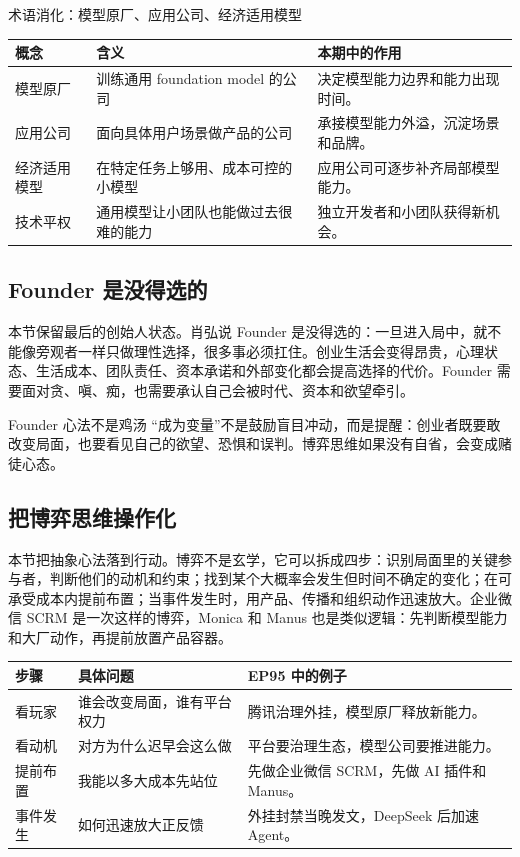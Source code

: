 \begin{knowledgebox}{术语消化：模型原厂、应用公司、经济适用模型}
\noindent\begin{tabularx}{\textwidth}{p{}p{}X}
\toprule
概念 & 含义 & 本期中的作用 \\
\midrule
模型原厂 & 训练通用 foundation model 的公司 & 决定模型能力边界和能力出现时间。 \\
应用公司 & 面向具体用户场景做产品的公司 & 承接模型能力外溢，沉淀场景和品牌。 \\
经济适用模型 & 在特定任务上够用、成本可控的小模型 & 应用公司可逐步补齐局部模型能力。 \\
技术平权 & 通用模型让小团队也能做过去很难的能力 & 独立开发者和小团队获得新机会。 \\
\bottomrule
\end{tabularx}
\end{knowledgebox}

\subsection{Founder 是没得选的}

本节保留最后的创始人状态。肖弘说 Founder 是没得选的：一旦进入局中，就不能像旁观者一样只做理性选择，很多事必须扛住。创业生活会变得昂贵，心理状态、生活成本、团队责任、资本承诺和外部变化都会提高选择的代价。Founder 需要面对贪、嗔、痴，也需要承认自己会被时代、资本和欲望牵引。

\begin{warningbox}{Founder 心法不是鸡汤}
“成为变量”不是鼓励盲目冲动，而是提醒：创业者既要敢改变局面，也要看见自己的欲望、恐惧和误判。博弈思维如果没有自省，会变成赌徒心态。
\end{warningbox}

\subsection{把博弈思维操作化}

本节把抽象心法落到行动。博弈不是玄学，它可以拆成四步：识别局面里的关键参与者，判断他们的动机和约束；找到某个大概率会发生但时间不确定的变化；在可承受成本内提前布置；当事件发生时，用产品、传播和组织动作迅速放大。企业微信 SCRM 是一次这样的博弈，Monica 和 Manus 也是类似逻辑：先判断模型能力和大厂动作，再提前放置产品容器。

\noindent\begin{tabularx}{\textwidth}{p{}p{}X}
\toprule
步骤 & 具体问题 & EP95 中的例子 \\
\midrule
看玩家 & 谁会改变局面，谁有平台权力 & 腾讯治理外挂，模型原厂释放新能力。 \\
看动机 & 对方为什么迟早会这么做 & 平台要治理生态，模型公司要推进能力。 \\
提前布置 & 我能以多大成本先站位 & 先做企业微信 SCRM，先做 AI 插件和 Manus。 \\
事件发生 & 如何迅速放大正反馈 & 外挂封禁当晚发文，DeepSeek 后加速 Agent。 \\
\bottomrule
\end{tabularx}


